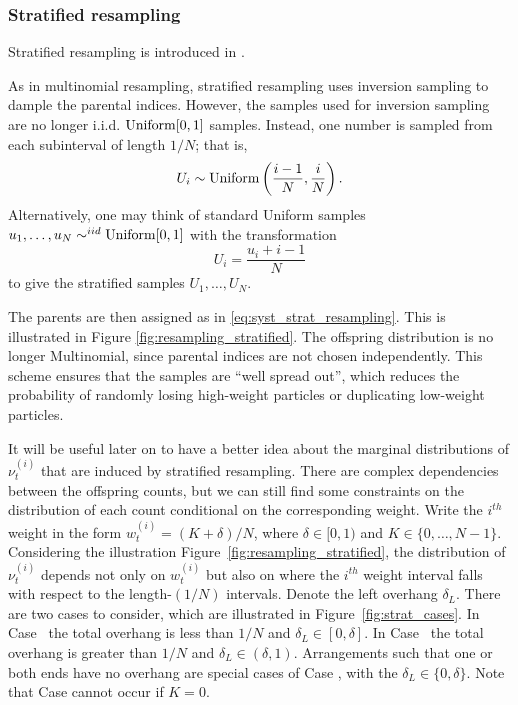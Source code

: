 \subsubsection{Stratified resampling \seb{$\checkmark$} }%
Stratified resampling is introduced in \cite{kitagawa1996}.

As in multinomial resampling, stratified resampling uses inversion sampling to dample the parental indices. However, the samples used for inversion sampling are no longer i.i.d. $\operatorname{Uniform}[0,1]$ samples. Instead, one number is sampled from each subinterval of length $1/N$; that is, 
\begin{equation*}
U_i \sim \operatorname{Uniform} \left(\frac{i-1}{N}, \frac{i}{N} \right) .
\end{equation*}
Alternatively, one may think of standard Uniform samples $u_1,\dots,u_N \sim^{iid} \operatorname{Uniform}[0,1]$ with the transformation
\begin{equation*}
U_i = \frac{u_i + i -1}{N}
\end{equation*}
to give the stratified samples $U_1,\dots,U_N$.

The parents are then assigned as in \eqref{eq:syst_strat_resampling}.
This is illustrated in Figure \ref{fig:resampling_stratified}.
The offspring distribution is no longer Multinomial, since parental indices are not chosen independently.
This scheme ensures that the samples are ``well spread out'', which reduces the probability of randomly losing high-weight particles or duplicating low-weight particles.

It will be useful later on to have a better idea about the marginal distributions of $\nu_t^{(i)}$ that are induced by stratified resampling. There are complex dependencies between the offspring counts, but we can still find some constraints on the distribution of each count conditional on the corresponding weight.
Write the $i^{th}$ weight in the form $w_t^{(i)} = (K + \delta)/N$, where $\delta \in [0,1)$ and $K\in \{0,\dots,N-1\}$.
Considering the illustration Figure~\ref{fig:resampling_stratified}, the distribution of $\nu_t^{(i)}$ depends not only on $w_t^{(i)}$ but also on where the $i^{th}$ weight interval falls with respect to the length-$(1/N)$ intervals. 
Denote the left overhang $\delta_L$.
There are two cases to consider, which are illustrated in Figure~\ref{fig:strat_cases}.
In Case~ the total overhang is less than $1/N$ and $\delta_L \in [0,\delta]$.
In Case~ the total overhang is greater than $1/N$ and $\delta_L \in (\delta, 1)$.
Arrangements such that one or both ends have no overhang are special cases of Case , with the $\delta_L \in \{0,\delta\}$.
Note that Case  cannot occur if $K=0$.

